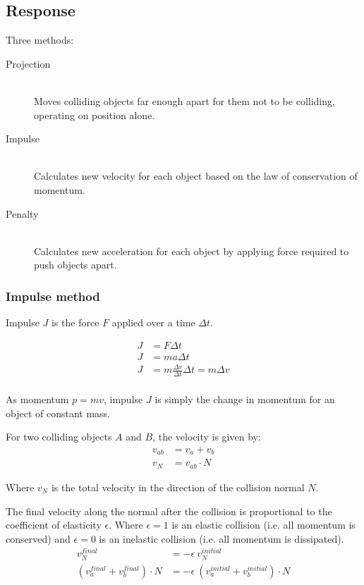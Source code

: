 \documentclass[a4paper]{article}
\begin{document}
\subsection{Response}

Three methods:
\begin{description}
  \item[Projection] \hfill \\
    Moves colliding objects far enough apart for them not to be colliding,
    operating on position alone.
  \item[Impulse] \hfill \\
    Calculates new velocity for each object based on the law of conservation of
    momentum.
  \item[Penalty] \hfill \\
    Calculates new acceleration for each object by applying force required to
    push objects apart.
\end{description}

\subsubsection{Impulse method}

Impulse $J$ is the force $F$ applied over a time $\Delta t$.

\begin{align*}
  J &= F \Delta t \\
  J &= ma \Delta t \tag*{$F = ma$} \\
  J &= m \frac{\Delta v}{\Delta t} \Delta t = m \Delta v
    \tag*{$a = \Delta v / \Delta t$} \\
\end{align*}

As momentum $p = mv$, impulse $J$ is simply the change in momentum for an object
of constant mass.

For two colliding objects $A$ and $B$, the velocity is given by:
\begin{align*}
  v_{ab} &= v_{a} + v_{b} \\
   v_{N} &= v_{ab} \cdot N
\end{align*}

Where $v_{N}$ is the total velocity in the direction of the collision normal
$N$.

The final velocity along the normal after the collision is proportional to the
coefficient of elasticity $\epsilon$. Where $\epsilon = 1$ is an elastic
collision (i.e. all momentum is conserved) and $\epsilon = 0$ is an inelastic
collision (i.e. all momentum is dissipated).
\begin{align*}
  v_{N}^{final} &= - \epsilon \: v_{N}^{initial} \\
  (v_{a}^{final} + v_{b}^{final}) \cdot N &=
    - \epsilon \: \left(v_{a}^{initial} + v_{b}^{initial}\right) \cdot N
\end{align*}
\end{document}
